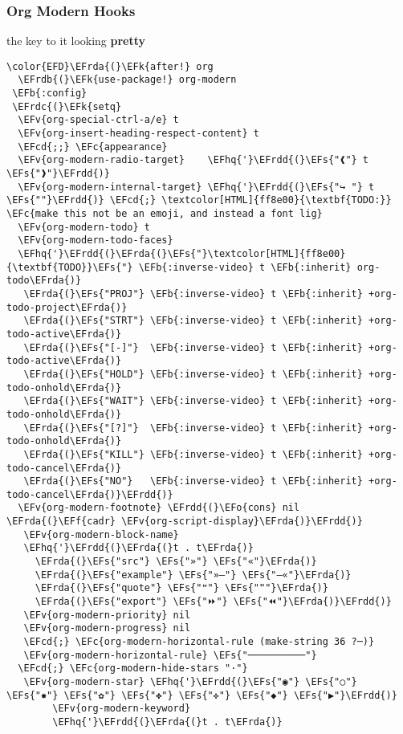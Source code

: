 \documentclass{article}
\newcommand{\EFc}[1]{\textcolor{EFc}{#1}} %
\newcommand{\EFcd}[1]{\textcolor{EFcd}{#1}} %
\newcommand{\EFs}[1]{\textcolor{EFs}{#1}} %
\newcommand{\EFk}[1]{\textcolor{EFk}{#1}} %
\newcommand{\EFb}[1]{\textcolor{EFb}{#1}} %
\newcommand{\EFf}[1]{\textcolor{EFf}{#1}} %
\newcommand{\EFv}[1]{\textcolor{EFv}{#1}} %
\newcommand{\EFo}[1]{\textcolor{EFo}{#1}} %
\newcommand{\EFhq}[1]{#1} %
\newcommand{\EFrda}[1]{\textcolor{EFrda}{#1}} %
\newcommand{\EFrdb}[1]{\textcolor{EFrdb}{#1}} %
\newcommand{\EFrdc}[1]{\textcolor{EFrdc}{#1}} %
\newcommand{\EFrdd}[1]{\textcolor{EFrdd}{#1}} %
\begin{document}
\subsubsection{Org Modern Hooks}
\label{sec:orgc369b97}
the key to it looking \textbf{pretty}
\begin{Code}
\begin{Verbatim}
\color{EFD}\EFrda{(}\EFk{after!} org
  \EFrdb{(}\EFk{use-package!} org-modern
 \EFb{:config}
 \EFrdc{(}\EFk{setq}
  \EFv{org-special-ctrl-a/e} t
  \EFv{org-insert-heading-respect-content} t
  \EFcd{;;} \EFc{appearance}
  \EFv{org-modern-radio-target}    \EFhq{'}\EFrdd{(}\EFs{"❰"} t \EFs{"❱"}\EFrdd{)}
  \EFv{org-modern-internal-target} \EFhq{'}\EFrdd{(}\EFs{"↪ "} t \EFs{""}\EFrdd{)} \EFcd{;} \textcolor[HTML]{ff8e00}{\textbf{TODO:}} \EFc{make this not be an emoji, and instead a font lig}
  \EFv{org-modern-todo} t
  \EFv{org-modern-todo-faces}
  \EFhq{'}\EFrdd{(}\EFrda{(}\EFs{"}\textcolor[HTML]{ff8e00}{\textbf{TODO}}\EFs{"} \EFb{:inverse-video} t \EFb{:inherit} org-todo\EFrda{)}
   \EFrda{(}\EFs{"PROJ"} \EFb{:inverse-video} t \EFb{:inherit} +org-todo-project\EFrda{)}
   \EFrda{(}\EFs{"STRT"} \EFb{:inverse-video} t \EFb{:inherit} +org-todo-active\EFrda{)}
   \EFrda{(}\EFs{"[-]"}  \EFb{:inverse-video} t \EFb{:inherit} +org-todo-active\EFrda{)}
   \EFrda{(}\EFs{"HOLD"} \EFb{:inverse-video} t \EFb{:inherit} +org-todo-onhold\EFrda{)}
   \EFrda{(}\EFs{"WAIT"} \EFb{:inverse-video} t \EFb{:inherit} +org-todo-onhold\EFrda{)}
   \EFrda{(}\EFs{"[?]"}  \EFb{:inverse-video} t \EFb{:inherit} +org-todo-onhold\EFrda{)}
   \EFrda{(}\EFs{"KILL"} \EFb{:inverse-video} t \EFb{:inherit} +org-todo-cancel\EFrda{)}
   \EFrda{(}\EFs{"NO"}   \EFb{:inverse-video} t \EFb{:inherit} +org-todo-cancel\EFrda{)}\EFrdd{)}
  \EFv{org-modern-footnote} \EFrdd{(}\EFo{cons} nil \EFrda{(}\EFf{cadr} \EFv{org-script-display}\EFrda{)}\EFrdd{)}
   \EFv{org-modern-block-name}
   \EFhq{'}\EFrdd{(}\EFrda{(}t . t\EFrda{)}
     \EFrda{(}\EFs{"src"} \EFs{"»"} \EFs{"«"}\EFrda{)}
     \EFrda{(}\EFs{"example"} \EFs{"»–"} \EFs{"–«"}\EFrda{)}
     \EFrda{(}\EFs{"quote"} \EFs{"❝"} \EFs{"❞"}\EFrda{)}
     \EFrda{(}\EFs{"export"} \EFs{"⏩"} \EFs{"⏪"}\EFrda{)}\EFrdd{)}
   \EFv{org-modern-priority} nil
   \EFv{org-modern-progress} nil
   \EFcd{;} \EFc{org-modern-horizontal-rule (make-string 36 ?─)}
   \EFv{org-modern-horizontal-rule} \EFs{"──────────"}
  \EFcd{;} \EFc{org-modern-hide-stars "·"}
   \EFv{org-modern-star} \EFhq{'}\EFrdd{(}\EFs{"◉"} \EFs{"○"} \EFs{"✸"} \EFs{"✿"} \EFs{"✤"} \EFs{"✜"} \EFs{"◆"} \EFs{"▶"}\EFrdd{)}
        \EFv{org-modern-keyword}
        \EFhq{'}\EFrdd{(}\EFrda{(}t . t\EFrda{)}

\end{Verbatim}
\end{Code}
\end{document}

